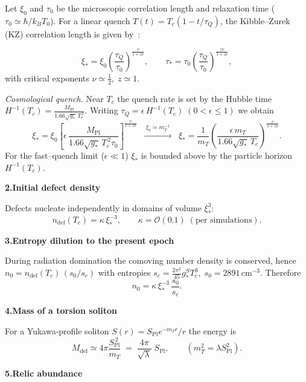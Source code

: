 \documentclass{article}
\newcommand{\Splanck}{S_{\mathrm{Pl}}}
\begin{document}
Let  
\(\xi_0\) and \(\tau_0\) be the microscopic correlation length
and relaxation time (\(\tau_0\simeq\hbar/k_{\!B}T_0\)).
For a linear quench \(T(t)=T_c(1-t/\tau_Q)\), the Kibble–Zurek (KZ) correlation length is given by~\cite{kibble1976,Żurek1985}:

\[
\xi_*=\xi_0\!\left(\frac{\tau_Q}{\tau_0}\right)^{\!\frac{\nu}{1+z\nu}},
\qquad
\tau_*=\tau_0\!\left(\frac{\tau_Q}{\tau_0}\right)^{\!\frac{z\nu}{1+z\nu}},
\]
with critical exponents \(\nu\simeq\frac12,\;z\simeq1\).

\medskip
\noindent
\emph{Cosmological quench.}  
Near \(T_c\) the quench rate is set by the Hubble time
\(H^{-1}(T_c)=\frac{M_{\text{Pl}}}{1.66\sqrt{g_*}\,T_c^{\,2}}\).
Writing \(\tau_Q=\epsilon\,H^{-1}(T_c)\;(0<\epsilon\le1)\) we obtain  
\[
\xi_*=\xi_0\left[\epsilon\,
\frac{M_{\text{Pl}}}{1.66\sqrt{g_*}\,T_c^{\,2}\tau_0}\right]^{\!\frac{\nu}{1+z\nu}}
\;\; \xrightarrow{\;\xi_0\simeq m_T^{-1}\;}
\;\;\xi_*=\frac{1}{m_T}\!
\left(\frac{\epsilon\,m_T}{1.66\sqrt{g_*}\,T_c}\right)^{\!\frac{\nu}{1+z\nu}}\!.
\]
For the fast--quench limit (\(\epsilon\!\ll\!1\)) \(\xi_*\) is bounded above by the particle horizon
\(H^{-1}(T_c)\).

\vspace{0.6em}
\noindent\textbf{2.\;Initial defect density}

Defects nucleate independently in domains of volume \(\xi_*^3\):
\[
n_{\text{def}}(T_c)=\kappa\,\xi_*^{-3},
\qquad
\kappa=\mathcal{O}(0.1)\;(\text{per simulations}).
\]

\vspace{0.6em}
\noindent\textbf{3.\;Entropy dilution to the present epoch}

During radiation domination the comoving number density is conserved, hence  
\(n_0 = n_{\text{def}}(T_c)\,(s_0/s_c)\) with entropies  
\(s_c=\tfrac{2\pi^2}{45}g_*^S T_c^{3},\; s_0=2891\,\text{cm}^{-3}\).
Therefore
\[
n_0 = \kappa\,\xi_*^{-3}\,
\frac{s_0}{s_c}.
\]

\vspace{0.6em}
\noindent\textbf{4.\;Mass of a torsion soliton}

For a Yukawa‑profile soliton  
\(S(r)=\Splanck e^{-m_T r}/r\) the energy is \cite[Eq.\,(5.1)]{GENESIS}
\[
M_{\text{def}}\simeq 4\pi\frac{\Splanck^{\,2}}{m_T}
        \;=\;\frac{4\pi}{\sqrt{\lambda}}\;\Splanck,
\qquad  (m_T^{2}=\lambda \Splanck^{2}).
\]

\vspace{0.6em}
\noindent\textbf{5.\;Relic abundance}
\end{document}
